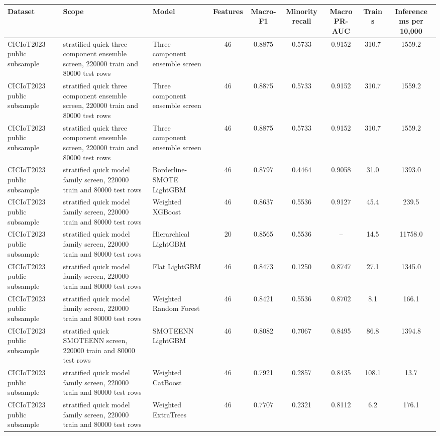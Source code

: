 \documentclass[10pt]{article}
\begin{document}
\begin{center}
\tiny
\setlength{\tabcolsep}{2pt}
\begin{longtable}{p{2.1cm}p{3.0cm}p{2.4cm}cccccc}
\toprule
Dataset & Scope & Model & Features & Macro-F1 & Minority recall & Macro PR-AUC & Train s & Inference ms per 10,000 \\
\midrule
\endhead
CICIoT2023 public subsample & stratified quick three component ensemble screen, 220000 train and 80000 test rows & Three component ensemble screen & 46 & 0.8875 & 0.5733 & 0.9152 & 310.7 & 1559.2 \\
CICIoT2023 public subsample & stratified quick three component ensemble screen, 220000 train and 80000 test rows & Three component ensemble screen & 46 & 0.8875 & 0.5733 & 0.9152 & 310.7 & 1559.2 \\
CICIoT2023 public subsample & stratified quick three component ensemble screen, 220000 train and 80000 test rows & Three component ensemble screen & 46 & 0.8875 & 0.5733 & 0.9152 & 310.7 & 1559.2 \\
CICIoT2023 public subsample & stratified quick model family screen, 220000 train and 80000 test rows & Borderline-SMOTE LightGBM & 46 & 0.8797 & 0.4464 & 0.9058 & 31.0 & 1393.0 \\
CICIoT2023 public subsample & stratified quick model family screen, 220000 train and 80000 test rows & Weighted XGBoost & 46 & 0.8637 & 0.5536 & 0.9127 & 45.4 & 239.5 \\
CICIoT2023 public subsample & stratified quick model family screen, 220000 train and 80000 test rows & Hierarchical LightGBM & 20 & 0.8565 & 0.5536 & -- & 14.5 & 11758.0 \\
CICIoT2023 public subsample & stratified quick model family screen, 220000 train and 80000 test rows & Flat LightGBM & 46 & 0.8473 & 0.1250 & 0.8747 & 27.1 & 1345.0 \\
CICIoT2023 public subsample & stratified quick model family screen, 220000 train and 80000 test rows & Weighted Random Forest & 46 & 0.8421 & 0.5536 & 0.8702 & 8.1 & 166.1 \\
CICIoT2023 public subsample & stratified quick SMOTEENN screen, 220000 train and 80000 test rows & SMOTEENN LightGBM & 46 & 0.8082 & 0.7067 & 0.8495 & 86.8 & 1394.8 \\
CICIoT2023 public subsample & stratified quick model family screen, 220000 train and 80000 test rows & Weighted CatBoost & 46 & 0.7921 & 0.2857 & 0.8435 & 108.1 & 13.7 \\
CICIoT2023 public subsample & stratified quick model family screen, 220000 train and 80000 test rows & Weighted ExtraTrees & 46 & 0.7707 & 0.2321 & 0.8112 & 6.2 & 176.1 \\

\end{longtable}
\end{center}
\end{document}
